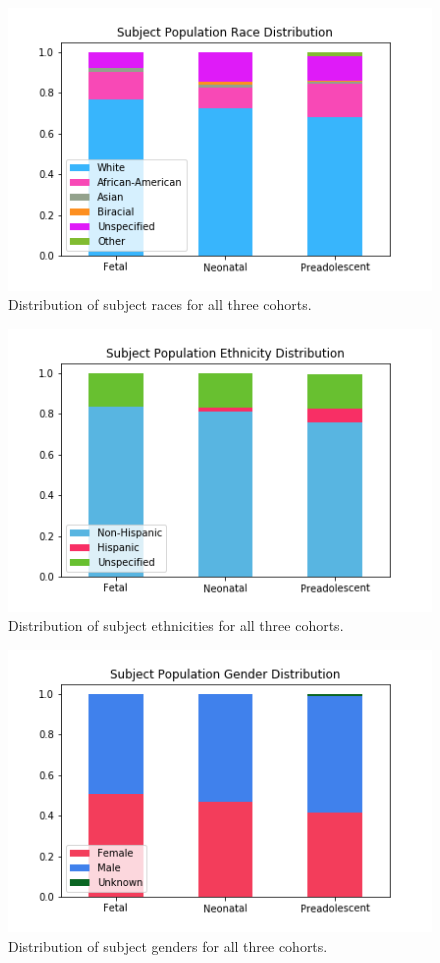 \begin{figure}
\centering
\includegraphics[width=.75\textwidth]{5/demo_clinical_subj_race.png}
\caption{Distribution of subject races for all three cohorts.}
\label{ch5:clinical:race}
\end{figure}%
%
\begin{figure}
\centering
\includegraphics[width=.75\textwidth]{5/demo_clinical_subj_ethnicity.png}
\caption{Distribution of subject ethnicities for all three cohorts.}
\label{ch5:clinical:eth}
\end{figure}

\begin{figure}
\centering
\includegraphics[width=.75\textwidth]{5/demo_clinical_subj_gender.png}
\caption{Distribution of subject genders for all three cohorts.}
\label{ch5:clinical:gender}
\end{figure}

